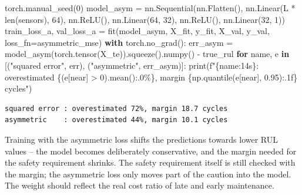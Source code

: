 \documentclass[
  letterpaper,
  DIV=11,
  numbers=noendperiod]{scrreprt}
\newenvironment{Shaded}{\begin{snugshade}}{\end{snugshade}}
\newcommand{\BuiltInTok}[1]{\textcolor[rgb]{0.00,0.23,0.31}{#1}}
\newcommand{\ControlFlowTok}[1]{\textcolor[rgb]{0.00,0.23,0.31}{\textbf{#1}}}
\newcommand{\DecValTok}[1]{\textcolor[rgb]{0.68,0.00,0.00}{#1}}
\newcommand{\FloatTok}[1]{\textcolor[rgb]{0.68,0.00,0.00}{#1}}
\newcommand{\KeywordTok}[1]{\textcolor[rgb]{0.00,0.23,0.31}{\textbf{#1}}}
\newcommand{\NormalTok}[1]{\textcolor[rgb]{0.00,0.23,0.31}{#1}}
\newcommand{\OperatorTok}[1]{\textcolor[rgb]{0.37,0.37,0.37}{#1}}
\newcommand{\SpecialCharTok}[1]{\textcolor[rgb]{0.37,0.37,0.37}{#1}}
\newcommand{\SpecialStringTok}[1]{\textcolor[rgb]{0.13,0.47,0.30}{#1}}
\newcommand{\StringTok}[1]{\textcolor[rgb]{0.13,0.47,0.30}{#1}}
\begin{document}
\begin{tcolorbox}
\begin{Shaded}
\begin{Highlighting}[]
\NormalTok{torch.manual\_seed(}\DecValTok{0}\NormalTok{)}
\NormalTok{model\_asym }\OperatorTok{=}\NormalTok{ nn.Sequential(nn.Flatten(), nn.Linear(L }\OperatorTok{*} \BuiltInTok{len}\NormalTok{(sensors), }\DecValTok{64}\NormalTok{), nn.ReLU(),}
\NormalTok{                           nn.Linear(}\DecValTok{64}\NormalTok{, }\DecValTok{32}\NormalTok{), nn.ReLU(), nn.Linear(}\DecValTok{32}\NormalTok{, }\DecValTok{1}\NormalTok{))}
\NormalTok{train\_loss\_a, val\_loss\_a }\OperatorTok{=}\NormalTok{ fit(model\_asym, X\_fit, y\_fit, X\_val, y\_val, loss\_fn}\OperatorTok{=}\NormalTok{asymmetric\_mse)}
\ControlFlowTok{with}\NormalTok{ torch.no\_grad():}
\NormalTok{    err\_asym }\OperatorTok{=}\NormalTok{ model\_asym(torch.tensor(X\_te)).squeeze().numpy() }\OperatorTok{{-}}\NormalTok{ true\_rul}
\ControlFlowTok{for}\NormalTok{ name, e }\KeywordTok{in}\NormalTok{ [(}\StringTok{"squared error"}\NormalTok{, err), (}\StringTok{"asymmetric"}\NormalTok{, err\_asym)]:}
    \BuiltInTok{print}\NormalTok{(}\SpecialStringTok{f"}\SpecialCharTok{\{}\NormalTok{name}\SpecialCharTok{:14s\}}\SpecialStringTok{: overestimated }\SpecialCharTok{\{}\NormalTok{(e[near] }\OperatorTok{\textgreater{}} \DecValTok{0}\NormalTok{)}\SpecialCharTok{.}\NormalTok{mean()}\SpecialCharTok{:.0\%\}}\SpecialStringTok{, margin }\SpecialCharTok{\{}\NormalTok{np}\SpecialCharTok{.}\NormalTok{quantile(e[near], }\FloatTok{0.95}\NormalTok{)}\SpecialCharTok{:.1f\}}\SpecialStringTok{ cycles"}\NormalTok{)}
\end{Highlighting}
\end{Shaded}

\begin{verbatim}
squared error : overestimated 72%, margin 18.7 cycles
asymmetric    : overestimated 44%, margin 10.1 cycles
\end{verbatim}

Training with the asymmetric loss shifts the predictions towards lower
RUL values -- the model becomes deliberately conservative, and the
margin needed for the safety requirement shrinks. The safety requirement
itself is still checked with the margin; the asymmetric loss only moves
part of the caution into the model. The weight should reflect the real
cost ratio of late and early maintenance.

\end{tcolorbox}
\end{document}
